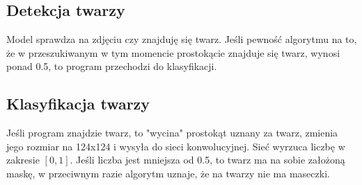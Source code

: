 \documentclass[12pt]{article}
\begin{document}
		\subsection{Detekcja twarzy}
		Model sprawdza na zdjęciu czy znajduję się twarz. Jeśli pewność algorytmu na to, że w przeszukiwanym w tym momencie prostokącie znajduje się twarz, wynosi ponad 0.5, to program przechodzi do klasyfikacji.
		\subsection{Klasyfikacja twarzy}
		Jeśli program znajdzie twarz, to "wycina" prostokąt uznany za twarz, zmienia jego rozmiar na 124x124 i wysyła do sieci konwolucyjnej. Sieć wyrzuca liczbę w zakresie \([0, 1]\). Jeśli liczba jest mniejsza od 0.5, to twarz ma na sobie założoną maskę, w przeciwnym razie algorytm uznaje, że na twarzy nie ma maseczki.
\end{document}
